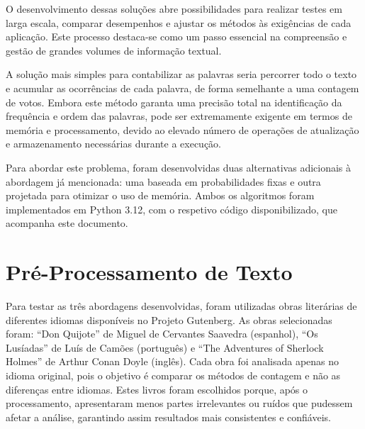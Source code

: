 \documentclass[shortpaper, portugues, times, mirror]{revdetua}
\begin{document}
O desenvolvimento dessas soluções abre possibilidades para realizar testes em larga escala, comparar desempenhos e ajustar os métodos às exigências de cada aplicação. Este processo destaca-se como um passo essencial na compreensão e gestão de grandes volumes de informação textual.

A solução mais simples para contabilizar as palavras seria percorrer todo o texto e acumular as ocorrências de cada palavra, de forma semelhante a uma contagem de votos. Embora este método garanta uma precisão total na identificação da frequência e ordem das palavras, pode ser extremamente exigente em termos de memória e processamento, devido ao elevado número de operações de atualização e armazenamento necessárias durante a execução.

Para abordar este problema, foram desenvolvidas duas alternativas adicionais à abordagem já mencionada: uma baseada em probabilidades fixas e outra projetada para otimizar o uso de memória. Ambos os algoritmos foram implementados em Python 3.12, com o respetivo código disponibilizado, que acompanha este documento.

\section{Pré-Processamento de Texto}
Para testar as três abordagens desenvolvidas, foram utilizadas obras literárias de diferentes idiomas disponíveis no Projeto Gutenberg. As obras selecionadas foram: “Don Quijote” de Miguel de Cervantes Saavedra (espanhol), “Os Lusíadas” de Luís de Camões (português) e “The Adventures of Sherlock Holmes” de Arthur Conan Doyle (inglês). Cada obra foi analisada apenas no idioma original, pois o objetivo é comparar os métodos de contagem e não as diferenças entre idiomas. Estes livros foram escolhidos porque, após o processamento, apresentaram menos partes irrelevantes ou ruídos que pudessem afetar a análise, garantindo assim resultados mais consistentes e confiáveis.
\end{document}
